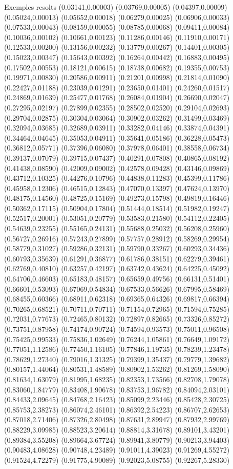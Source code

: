 \documentclass[11pt,a4paper]{article}
\begin{document}
\begin{fmex}{Exemples resolts}
(0.03141,0.00003) (0.03769,0.00005) (0.04397,0.00009) (0.05024,0.00013) (0.05652,0.00018) (0.06279,0.00025) (0.06906,0.00033) (0.07533,0.00043) (0.08159,0.00055) (0.08785,0.00068) (0.09411,0.00084) (0.10036,0.00102) (0.10661,0.00123) (0.11286,0.00146) (0.11910,0.00171) (0.12533,0.00200) (0.13156,0.00232) (0.13779,0.00267) (0.14401,0.00305) (0.15023,0.00347) (0.15643,0.00392) (0.16264,0.00442) (0.16883,0.00495) (0.17502,0.00553) (0.18121,0.00615) (0.18738,0.00682) (0.19355,0.00753) (0.19971,0.00830) (0.20586,0.00911) (0.21201,0.00998) (0.21814,0.01090) (0.22427,0.01188) (0.23039,0.01291) (0.23650,0.01401) (0.24260,0.01517) (0.24869,0.01639) (0.25477,0.01768) (0.26084,0.01904) (0.26690,0.02047) (0.27295,0.02197) (0.27899,0.02355) (0.28502,0.02520) (0.29104,0.02693) (0.29704,0.02875) (0.30304,0.03064) (0.30902,0.03262) (0.31499,0.03469) (0.32094,0.03685) (0.32689,0.03911) (0.33282,0.04146) (0.33874,0.04391) (0.34464,0.04645) (0.35053,0.04911) (0.35641,0.05186) (0.36228,0.05473) (0.36812,0.05771) (0.37396,0.06080) (0.37978,0.06401) (0.38558,0.06734) (0.39137,0.07079) (0.39715,0.07437) (0.40291,0.07808) (0.40865,0.08192) (0.41438,0.08590) (0.42009,0.09002) (0.42578,0.09428) (0.43146,0.09869) (0.43712,0.10325) (0.44276,0.10796) (0.44838,0.11283) (0.45399,0.11786) (0.45958,0.12306) (0.46515,0.12843) (0.47070,0.13397) (0.47624,0.13970) (0.48175,0.14560) (0.48725,0.15169) (0.49273,0.15798) (0.49819,0.16446) (0.50362,0.17115) (0.50904,0.17804) (0.51444,0.18514) (0.51982,0.19247) (0.52517,0.20001) (0.53051,0.20779) (0.53583,0.21580) (0.54112,0.22405) (0.54639,0.23255) (0.55165,0.24131) (0.55688,0.25032) (0.56208,0.25960) (0.56727,0.26916) (0.57243,0.27899) (0.57757,0.28912) (0.58269,0.29954) (0.58779,0.31027) (0.59286,0.32131) (0.59790,0.33267) (0.60293,0.34436) (0.60793,0.35639) (0.61291,0.36877) (0.61786,0.38151) (0.62279,0.39461) (0.62769,0.40810) (0.63257,0.42197) (0.63742,0.43624) (0.64225,0.45092) (0.64706,0.46603) (0.65183,0.48157) (0.65659,0.49756) (0.66131,0.51401) (0.66601,0.53093) (0.67069,0.54834) (0.67533,0.56626) (0.67995,0.58469) (0.68455,0.60366) (0.68911,0.62318) (0.69365,0.64326) (0.69817,0.66394) (0.70265,0.68521) (0.70711,0.70711) (0.71154,0.72965) (0.71594,0.75285) (0.72031,0.77673) (0.72465,0.80132) (0.72897,0.82665) (0.73326,0.85272) (0.73751,0.87958) (0.74174,0.90724) (0.74594,0.93573) (0.75011,0.96508) (0.75425,0.99533) (0.75836,1.02649) (0.76244,1.05861) (0.76649,1.09172) (0.77051,1.12586) (0.77450,1.16105) (0.77846,1.19735) (0.78239,1.23478) (0.78629,1.27340) (0.79016,1.31325) (0.79399,1.35437) (0.79779,1.39682) (0.80157,1.44064) (0.80531,1.48589) (0.80902,1.53262) (0.81269,1.58090) (0.81634,1.63079) (0.81995,1.68235) (0.82353,1.73566) (0.82708,1.79078) (0.83060,1.84779) (0.83408,1.90678) (0.83753,1.96782) (0.84094,2.03101) (0.84433,2.09645) (0.84768,2.16423) (0.85099,2.23446) (0.85428,2.30725) (0.85753,2.38273) (0.86074,2.46101) (0.86392,2.54223) (0.86707,2.62653) (0.87018,2.71406) (0.87326,2.80498) (0.87631,2.89947) (0.87932,2.99769) (0.88229,3.09985) (0.88523,3.20614) (0.88814,3.31678) (0.89101,3.43201) (0.89384,3.55208) (0.89664,3.67724) (0.89941,3.80779) (0.90213,3.94403) (0.90483,4.08628) (0.90748,4.23489) (0.91011,4.39023) (0.91269,4.55272) (0.91524,4.72279) (0.91775,4.90089) (0.92023,5.08755) (0.92267,5.28330) 
\end{fmex}
\end{document}
